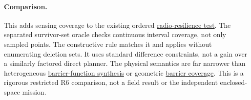 \documentclass{article}
\begin{document}
\paragraph{Comparison.}
This adds sensing coverage to the existing ordered
\href{https://github.com/eternal-november/eos-research-programmes/pull/375}{radio-resilience test}.
The separated survivor-set oracle checks continuous interval coverage,
not only sampled points. The constructive rule matches it and applies
without enumerating deletion sets. It uses standard difference
constraints, not a gain over a similarly factored direct planner.
The physical semantics are far narrower than heterogeneous
\href{https://arxiv.org/abs/2210.01354}{barrier-function synthesis}
or geometric
\href{https://www.cs.memphis.edu/~santosh/Papers/BarrierCoverageMobiCom05.pdf}{barrier coverage}.
This is a rigorous restricted R6 comparison, not a field result
or the independent enclosed-space mission.
\end{document}
